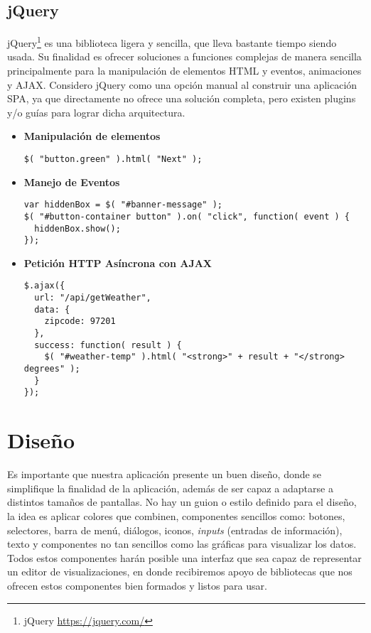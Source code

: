 \subsection{jQuery}
jQuery\footnote{jQuery \url{https://jquery.com/}} es una biblioteca ligera y sencilla, que lleva bastante tiempo siendo usada. Su finalidad es ofrecer soluciones a funciones complejas de manera sencilla principalmente para la manipulación de elementos HTML y eventos, animaciones y AJAX. Considero jQuery como una opción manual al construir una aplicación SPA, ya que directamente no ofrece una solución completa, pero existen plugins y/o guías para lograr dicha arquitectura.

\begin{itemize}

\item\textbf{Manipulación de elementos}
\begin{lstlisting}
$( "button.green" ).html( "Next" );
\end{lstlisting}

\item\textbf{Manejo de Eventos}
\begin{lstlisting}
var hiddenBox = $( "#banner-message" );
$( "#button-container button" ).on( "click", function( event ) {
  hiddenBox.show();
});
\end{lstlisting}

\item\textbf{Petición HTTP Asíncrona con AJAX}
\begin{lstlisting}
$.ajax({
  url: "/api/getWeather",
  data: {
    zipcode: 97201
  },
  success: function( result ) {
    $( "#weather-temp" ).html( "<strong>" + result + "</strong> degrees" );
  }
});
\end{lstlisting}
\end{itemize}

\section{Diseño}

Es importante que nuestra aplicación presente un buen diseño, donde se simplifique la finalidad de la aplicación, además de ser capaz a adaptarse a distintos tamaños de pantallas. No hay un guion o estilo definido para el diseño, la idea es aplicar colores que combinen, componentes sencillos como: botones, selectores, barra de menú, diálogos, iconos, \textit{inputs} (entradas de información), texto y componentes no tan sencillos como las gráficas para visualizar los datos. Todos estos componentes harán posible una interfaz que sea capaz de representar un editor de visualizaciones, en donde recibiremos apoyo de bibliotecas que nos ofrecen estos componentes bien formados y listos para usar.

